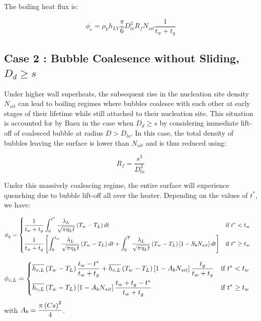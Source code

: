 \npar
The boiling heat flux is:

\begin{equation}
\phi_{e} = \rho_{V}h_{LV}\frac{\pi}{6}D_{lo}^{3}R_{f}N_{sit}\frac{1}{t_{w}+t_{g}}
\label{eq:basu_hfp_phie}
\end{equation}


\subsection{Case 2 : Bubble Coalesence without Sliding, $D_{d}\geq s$}

Under higher wall superheats, the subsequent rise in the nucleation site density $N_{sit}$ can lead to boiling regimes where bubbles coalesce with each other at early stages of their lifetime \ie while still attached to their nucleation site. This situation is accounted for by Basu \etal in the case when $D_{d} \geq s$ by considering immediate lift-off of coalesced bubble at radius $D > D_{lo}$. In this case, the total density of bubbles leaving the surface is lower than $N_{sit}$ and is thus reduced using:

\begin{equation}
R_{f} = \frac{s^{3}}{D_{lo}^{3}}
\end{equation}

Under this massively coalescing regime, the entire surface will experience quenching due to bubble lift-off all over the heater. Depending on the values of $t^{*}$, we have:

\begin{align}
\phi_{q} &= 
\begin{dcases} \dfrac{1}{t_{w}+t_{g}} \int_{0}^{t^{*}}\dfrac{\lambda_{L}}{\sqrt{\pi \eta_{L}t}}\parth{T_{w}-T_{L}}dt & \text{if } t^{*}<t_{w} \\
%
\dfrac{1}{t_{w}+t_{g}} \crocht{ \int_{0}^{t_{w}}\dfrac{\lambda_{L}}{\sqrt{\pi \eta_{L}t}}\parth{T_{w}-T_{L}}dt + \int_{0}^{T}\dfrac{\lambda_{L}}{\sqrt{\pi \eta_{L}t}}\parth{T_{w}-T_{L}}\crocht{1-S_{b}N_{sit}}dt} & \text{if } t^{*}\geq t_{w} 
\end{dcases}
\end{align}

\begin{align}
\phi_{c,L} &= 
\begin{dcases} \overline{h_{c,L}}\parth{T_{w}-T_{L}}\frac{t_{w}-t^{*}}{t_{w}+t_{g}} + \overline{h_{c,L}}\parth{T_{w}-T_{L}}\crocht{1-A_{b}N_{sit}}\frac{t_{g}}{t_{w}+t_{g}} & \text{if } t^{*}<t_{w} \\
%
\overline{h_{c,L}}\parth{T_{w}-T_{L}}\crocht{1-A_{b}N_{sit}}\frac{t_{w}+t_{g}-t^{*}}{t_{w}+t_{g}} & \text{if } t^{*}\geq t_{w} 
\end{dcases}
\end{align}
with $A_{b} = \dfrac{\pi \left( Cs \right)^{2}}{4}$.
\npar

